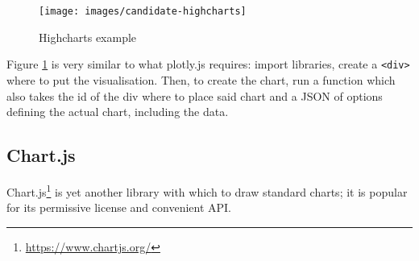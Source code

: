 \documentclass[10pt,]{krantz}
\renewcommand{\href}[2]{#2\footnote{\url{#1}}}
\begin{document}
\begin{figure}[H]

{\centering \texttt{[image: images/candidate-highcharts]} 

}

\caption{Highcharts example}\label{fig:candidate-highcharts}
\end{figure}

Figure \ref{fig:candidate-highcharts} is very similar to what plotly.js requires: import libraries, create a \texttt{\textless{}div\textgreater{}} where to put the visualisation. Then, to create the chart, run a function which also takes the id of the div where to place said chart and a JSON of options defining the actual chart, including the data.

\hypertarget{widgets-basics-candidates-chart.js}{%
\subsection{Chart.js}\label{widgets-basics-candidates-chart.js}}

\href{https://www.chartjs.org/}{Chart.js} is yet another library with which to draw standard charts; it is popular for its permissive license and convenient API.
\end{document}
